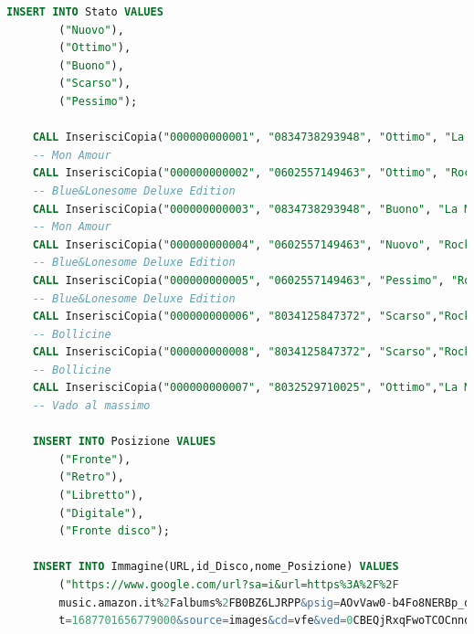 \documentclass{article}
\begin{document}
\begin{lstlisting}[language=SQL]
    INSERT INTO Stato VALUES
        ("Nuovo"),
        ("Ottimo"),
        ("Buono"),
        ("Scarso"),
        ("Pessimo");
        
    CALL InserisciCopia("000000000001", "0834738293948", "Ottimo", "La Mia Preferita","Mickey789"); 
    -- Mon Amour 
    CALL InserisciCopia("000000000002", "0602557149463", "Ottimo", "Rock","Pluto456"); 
    -- Blue&Lonesome Deluxe Edition
    CALL InserisciCopia("000000000003", "0834738293948", "Buono", "La Mia Preferita","Mickey789"); 
    -- Mon Amour
    CALL InserisciCopia("000000000004", "0602557149463", "Nuovo", "Rock" , "Pippo123"); 
    -- Blue&Lonesome Deluxe Edition
    CALL InserisciCopia("000000000005", "0602557149463", "Pessimo", "Rock", "Pippo123"); 
    -- Blue&Lonesome Deluxe Edition
    CALL InserisciCopia("000000000006", "8034125847372", "Scarso","Rock","Pippo123"); 
    -- Bollicine
    CALL InserisciCopia("000000000008", "8034125847372", "Scarso","Rock","Pluto456"); 
    -- Bollicine
    CALL InserisciCopia("000000000007", "8032529710025", "Ottimo","La Mia Preferita","Mickey789"); 
    -- Vado al massimo

    INSERT INTO Posizione VALUES
        ("Fronte"),
        ("Retro"),
        ("Libretto"),
        ("Digitale"),
        ("Fronte disco");

    INSERT INTO Immagine(URL,id_Disco,nome_Posizione) VALUES
        ("https://www.google.com/url?sa=i&url=https%3A%2F%2F
        music.amazon.it%2Falbums%2FB0BZ6LJRPP&psig=AOvVaw0-b4Fo8NERBp_dPyt-TX-P&us
        t=1687701656779000&source=images&cd=vfe&ved=0CBEQjRxqFwoTCOCnnd-I3P8CFQAAAAAdAAAAABAE",(SELECT D.id FROM Disco D WHERE D.EAN = "0834738293948"),"Digitale");
\end{lstlisting}
\end{document}
